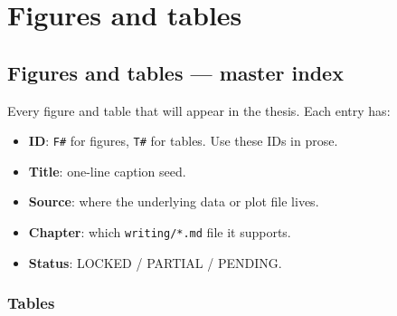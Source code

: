 \documentclass[11pt,a4paper,openany]{report}
\begin{document}
\part*{Figures and tables}
\chapter{Figures and tables — master index}

Every figure and table that will appear in the thesis. Each entry has:

\begin{itemize}
  \item \textbf{ID}: \texttt{F\#} for figures, \texttt{T\#} for tables. Use these IDs in prose.
  \item \textbf{Title}: one-line caption seed.
  \item \textbf{Source}: where the underlying data or plot file lives.
  \item \textbf{Chapter}: which \texttt{writing/*.md} file it supports.
  \item \textbf{Status}: LOCKED / PARTIAL / PENDING.
\end{itemize}

\section{Tables}
\end{document}
